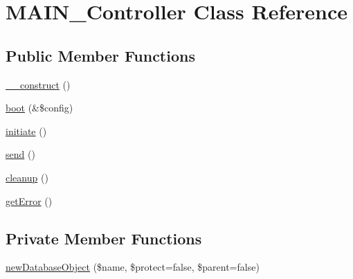 \hypertarget{classMAIN__Controller}{
\section{MAIN\_\-Controller Class Reference}
\label{d0/d6f/classMAIN__Controller}
}
\subsection*{Public Member Functions}
\begin{DoxyCompactItemize}
\item 
\hyperlink{classMAIN__Controller_af1465bb574b9238d78d1b0172fb5249e}{\_\-\_\-construct} ()
\item 
\hyperlink{classMAIN__Controller_a5c77de67c4b47bcda0c997a5db3f32fa}{boot} (\&\$config)
\item 
\hyperlink{classMAIN__Controller_a63a01965c1673fbdbe5eb374ddf5c8d6}{initiate} ()
\item 
\hyperlink{classMAIN__Controller_a940555212e44afb717f9c11e9b6424d8}{send} ()
\item 
\hyperlink{classMAIN__Controller_a6400bbd98dfe782c6c54b46e035a92c1}{cleanup} ()
\item 
\hyperlink{classMAIN__Controller_a8d9ca0c2bdd69d2d18fa90de23acc2de}{getError} ()
\end{DoxyCompactItemize}
\subsection*{Private Member Functions}
\begin{DoxyCompactItemize}
\item 
\hyperlink{classMAIN__Controller_abdf41ec9c3425b16d70236e0fe497b9f}{newDatabaseObject} (\$name, \$protect=false, \$parent=false)
\end{DoxyCompactItemize}

